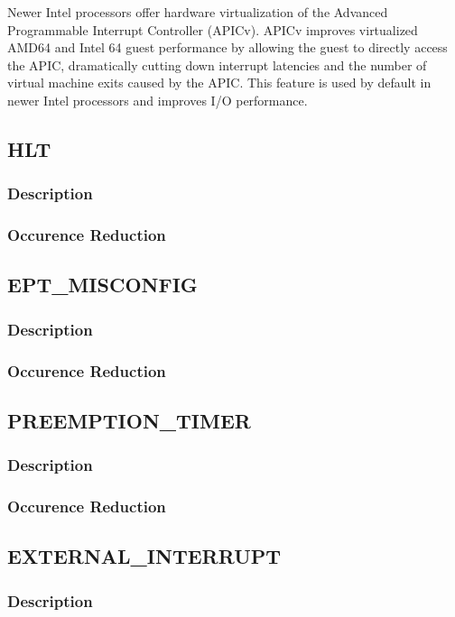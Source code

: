 \documentclass[MMR,Master,english]{twbook}
\begin{document}
Newer Intel processors offer hardware virtualization of the Advanced Programmable Interrupt Controller (APICv). APICv improves virtualized AMD64 and Intel 64 guest performance by allowing the guest to directly access the APIC, dramatically cutting down interrupt latencies and the number of virtual machine exits caused by the APIC. This feature is used by default in newer Intel processors and improves I/O performance.





\clearpage
\subsection{HLT}
\subsubsection{Description}
\subsubsection{Occurence Reduction}
\clearpage
\subsection{EPT\_MISCONFIG}
\subsubsection{Description}
\subsubsection{Occurence Reduction}
\clearpage
\subsection{PREEMPTION\_TIMER}
\subsubsection{Description}
\subsubsection{Occurence Reduction}
\clearpage
\subsection{EXTERNAL\_INTERRUPT}
\subsubsection{Description}
\end{document}
